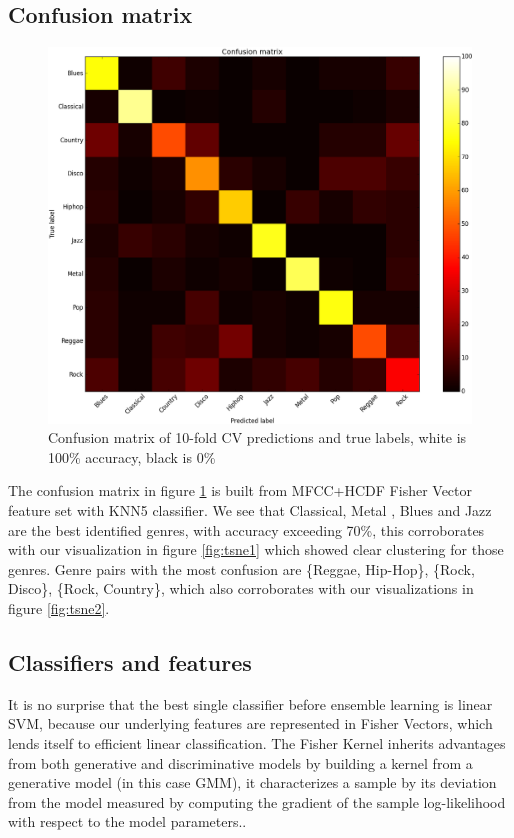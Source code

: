 \subsection{Confusion matrix}
\begin{figure}
	\includegraphics[width=\textwidth]{confusion_matrix.png}
	\caption{Confusion matrix of 10-fold CV predictions and true labels, white is 100\% accuracy, black is 0\%}
	\label{fig:confusion}
\end{figure}
The confusion matrix in figure \ref{fig:confusion} is built from MFCC+HCDF Fisher Vector feature set with KNN5 classifier. We see that Classical, Metal , Blues and Jazz are the best identified genres, with accuracy exceeding 70\%, this corroborates with our visualization in figure \ref{fig:tsne1} which showed clear clustering for those genres. Genre pairs with the most confusion are \{Reggae, Hip-Hop\}, \{Rock, Disco\}, \{Rock, Country\}, which also corroborates with our visualizations in figure \ref{fig:tsne2}. 
\subsection{Classifiers and features}
It is no surprise that the best single classifier before ensemble learning is linear SVM, because our underlying features are represented in Fisher Vectors, which lends itself to efficient linear classification.
The Fisher Kernel inherits advantages from both generative and discriminative models by building a kernel from a generative model (in this case GMM),  it characterizes a sample by its deviation from the model measured by computing the gradient of the sample log-likelihood with  respect  to  the  model  parameters.\cite{HAL}.
